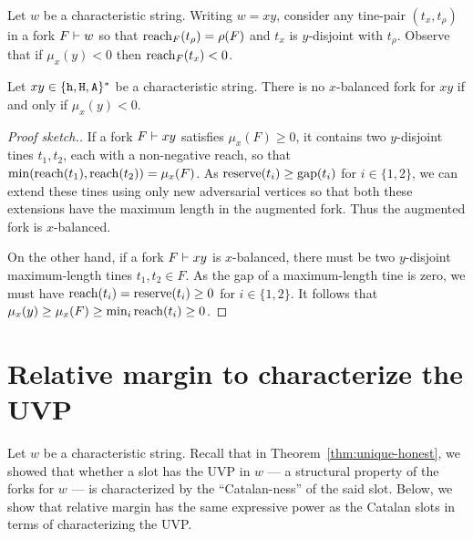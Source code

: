 Let $w$ be a characteristic string. 
Writing $w = xy$, 
consider any tine-pair $(t_x, t_\rho)$ in a fork $F \vdash w$ so that 
$\operatorname{reach}_F(t_\rho) = \rho(F)$ and $t_x$ is $y$-disjoint with $t_\rho$.
Observe that if $\mu_x(y) < 0$ then $\operatorname{reach}_F(t_x) < 0$. 

\begin{fact}\label{fact:margin-balance}
  Let $xy \in \{\mathtt{h}, \mathtt{H}, \mathtt{A}\}^*$ be a characteristic string. 
  There is no 
  $x$-balanced fork for $xy$ 
  if and only if 
  $\mu_x(y) < 0$.
\end{fact}
\begin{proof}[Proof sketch.]  
  If a fork $F \vdash xy$ 
  satisfies $\mu_x(F) \geq 0$, 
  it contains two $y$-disjoint tines $t_1, t_2$, 
  each with a non-negative reach, 
  so that $\min(\operatorname{reach}(t_1), \operatorname{reach}(t_2)) = \mu_x(F)$. 
  As $\operatorname{reserve}(t_i) \geq \operatorname{gap}(t_i)$ for $i \in \{1,2\}$, 
  we can extend these tines using only new adversarial vertices 
  so that both these extensions 
  have the maximum length 
  in the augmented fork. 
  Thus the augmented fork is $x$-balanced.

  On the other hand, if a fork $F \vdash xy$ is $x$-balanced, 
  there must be two $y$-disjoint 
  maximum-length tines $t_1, t_2 \in F$. 
  As the gap of a maximum-length tine is zero, 
  we must have $\operatorname{reach}(t_i) = \operatorname{reserve}(t_i) \geq 0$ 
  for $i \in \{1, 2\}$. 
  It follows that $\mu_x(y) \geq \mu_x(F) \geq \min_i \operatorname{reach}(t_i) \geq 0$.
\end{proof}



\section{Relative margin to characterize the UVP}
Let $w$ be a characteristic string. 
Recall that in Theorem~\ref{thm:unique-honest}, 
we showed that whether a slot has the UVP in $w$ --- a 
structural property of the forks for $w$ --- is 
characterized by the ``Catalan-ness'' of the said slot. 
Below, we show that relative margin 
has the same expressive power 
as the Catalan slots 
in terms of characterizing the UVP. 


